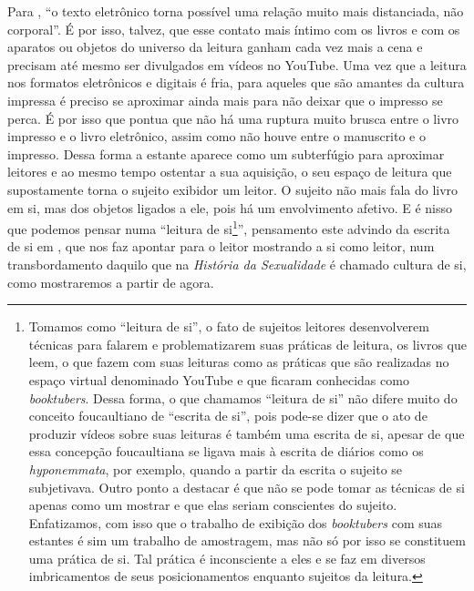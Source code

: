 Para \textcite[p. 16]{chartier1998aventura}, “o texto eletrônico torna possível uma relação muito mais distanciada, não corporal”. É por isso, talvez, que esse contato mais íntimo com os livros e com os aparatos ou objetos do universo da leitura ganham cada vez mais a cena e precisam até mesmo ser divulgados em vídeos no YouTube. Uma vez que a leitura nos formatos eletrônicos e digitais é fria, para aqueles que são amantes da cultura impressa é preciso se aproximar ainda mais para não deixar que o impresso se perca. É por isso que \textcite{chartier1998aventura} pontua que não há uma ruptura muito brusca entre o livro impresso e o livro eletrônico, assim como não houve entre o manuscrito e o impresso. Dessa forma a estante aparece como um subterfúgio para aproximar leitores e ao mesmo tempo ostentar a sua aquisição, o seu espaço de leitura que supostamente torna o sujeito exibidor um leitor. O sujeito não mais fala do livro em si, mas dos objetos ligados a ele, pois há um envolvimento afetivo. E é nisso que podemos pensar numa “leitura de si\footnote{Tomamos como “leitura de si”, o fato de sujeitos leitores desenvolverem técnicas para falarem e problematizarem suas práticas de leitura, os livros que leem, o que fazem com suas leituras como as práticas que são realizadas no espaço virtual denominado YouTube e que ficaram conhecidas como \textit{booktubers}. Dessa forma, o que chamamos “leitura de si” não difere muito do conceito foucaultiano de “escrita de si”, pois pode-se dizer que o ato de produzir vídeos sobre suas leituras é também uma escrita de si, apesar de que essa concepção foucaultiana se ligava mais à escrita de diários como os \textit{hyponemmata}, por exemplo, quando a partir da escrita o sujeito se subjetivava. Outro ponto a destacar é que não se pode tomar as técnicas de si apenas como um mostrar e que elas seriam conscientes do sujeito. Enfatizamos, com isso que o trabalho de exibição dos \textit{booktubers} com suas estantes é sim um trabalho de amostragem, mas não só por isso se constituem uma prática de si. Tal prática é inconsciente a eles e se faz em diversos imbricamentos de seus posicionamentos enquanto sujeitos da leitura.}”, pensamento este advindo da escrita de si em \textcite{foucault2006escrita}, que nos faz apontar para o leitor mostrando a si como leitor, num transbordamento daquilo que na \textit{História da Sexualidade} é chamado cultura de si, como mostraremos a partir de agora.

